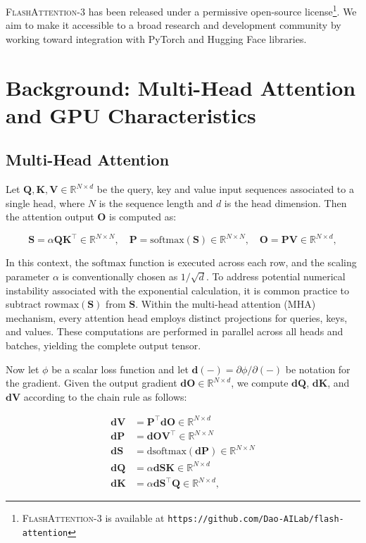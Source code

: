 \begin{enumerate}
\textsc{FlashAttention-3} has been released under a permissive open-source license\footnote{\textsc{FlashAttention-3}
  is available at \texttt{https://github.com/Dao-AILab/flash-attention}}. We aim to make it accessible to a broad research and development community by working toward integration with PyTorch and Hugging Face libraries.

\section{Background: Multi-Head Attention and GPU Characteristics}
\label{sec:background}

\subsection{Multi-Head Attention}
\label{subsec:multi_head_attn}

Let $\mathbf{Q}, \mathbf{K}, \mathbf{V} \in \mathbb{R}^{N \times d}$ be the query, key and value input sequences associated to a single head, where $N$ is the sequence length and $d$ is the head dimension. Then the attention output $\mathbf{O}$ is computed as:

\begin{equation*}
  \mathbf{S} = \alpha \mathbf{Q} \mathbf{K}^\top \in \mathbb{R}^{N \times N}, \quad \mathbf{P} = \mathrm{softmax}(\mathbf{S}) \in \mathbb{R}^{N \times N}, \quad \mathbf{O} = \mathbf{P}\mathbf{V} \in \mathbb{R}^{N \times d},
\end{equation*}

In this context, the $\mathrm{softmax}$ function is executed across each row, and the scaling parameter $\alpha$ is conventionally chosen as $1/\sqrt{d}$. To address potential numerical instability associated with the exponential calculation, it is common practice to subtract $\mathrm{rowmax}(\mathbf{S})$ from $\mathbf{S}$. Within the multi-head attention (MHA) mechanism, every attention head employs distinct projections for queries, keys, and values. These computations are performed in parallel across all heads and batches, yielding the complete output tensor.

Now let $\phi$ be a scalar loss function and let $\mathbf{d}(-) = \partial \phi / \partial (-)$ be notation for the gradient. Given the output gradient $\mathbf{dO} \in \mathbb{R}^{N \times d}$, we compute $\mathbf{dQ}$, $\mathbf{dK}$, and $\mathbf{dV}$ according to the chain rule as follows:

\begin{align*}
  \mathbf{dV} &= \mathbf{P}^\top \mathbf{dO} \in \mathbb{R}^{N \times d} \\
  \mathbf{dP} &= \mathbf{dO} \mathbf{V}^\top \in \mathbb{R}^{N \times N} \\
  \mathbf{dS} &= \mathrm{dsoftmax} (\mathbf{dP}) \in \mathbb{R}^{N \times N} \\
  \mathbf{dQ} &= \alpha \mathbf{dS} \mathbf{K} \in \mathbb{R}^{N \times d} \\
  \mathbf{dK} &= \alpha \mathbf{dS}^\top \mathbf{Q} \in \mathbb{R}^{N \times d},
\end{align*}


\end{enumerate}
